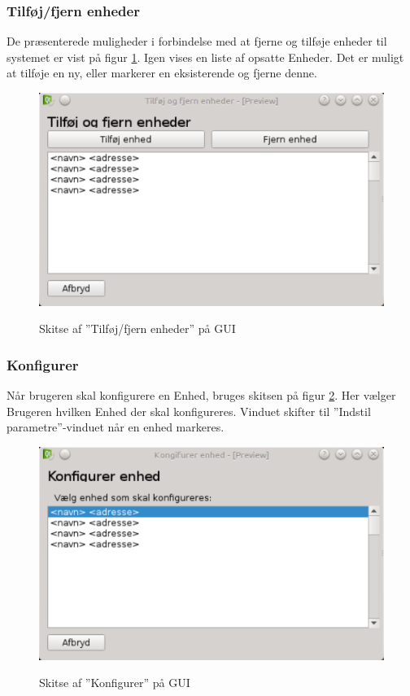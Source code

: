 \subsubsection{Tilføj/fjern enheder}
De præsenterede muligheder i forbindelse med at fjerne og tilføje enheder til systemet er vist på figur \ref{fig:GUI-tilfoj-fjern}. Igen vises en liste af opsatte Enheder. Det er muligt at tilføje en ny, eller markerer en eksisterende og fjerne denne.

\begin{figure}[htbp] \centering
{\includegraphics[scale=0.5]{filer/pics/GUI/Tilfoj-fjern-enheder}}
\caption{Skitse af ''Tilføj/fjern enheder'' på GUI}
\label{fig:GUI-tilfoj-fjern}
\end{figure}

\subsubsection{Konfigurer}
Når brugeren skal konfigurere en Enhed, bruges skitsen på figur \ref{fig:GUI-konfigurer}. Her vælger Brugeren hvilken Enhed der skal konfigureres. Vinduet skifter til ''Indstil parametre''-vinduet når en enhed markeres.

\begin{figure}[htbp] \centering
{\includegraphics[scale=0.5]{filer/pics/GUI/Konfigurer-enhed}}
\caption{Skitse af ''Konfigurer'' på GUI}
\label{fig:GUI-konfigurer}
\end{figure}

